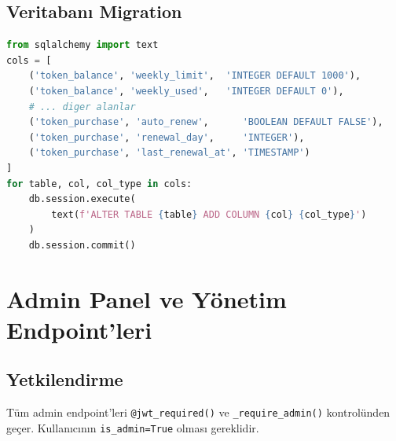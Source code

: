 \documentclass[12pt,a4paper]{article}
\begin{document}
\subsection{Veritaban{\i} Migration}
\begin{lstlisting}[language=Python, caption={Migration scripti}]
from sqlalchemy import text
cols = [
    ('token_balance', 'weekly_limit',  'INTEGER DEFAULT 1000'),
    ('token_balance', 'weekly_used',   'INTEGER DEFAULT 0'),
    # ... diger alanlar
    ('token_purchase', 'auto_renew',      'BOOLEAN DEFAULT FALSE'),
    ('token_purchase', 'renewal_day',     'INTEGER'),
    ('token_purchase', 'last_renewal_at', 'TIMESTAMP')
]
for table, col, col_type in cols:
    db.session.execute(
        text(f'ALTER TABLE {table} ADD COLUMN {col} {col_type}')
    )
    db.session.commit()
\end{lstlisting}

\section{Admin Panel ve Y\"{o}netim Endpoint'leri}

\subsection{Yetkilendirme}
T\"{u}m admin endpoint'leri \texttt{@jwt\_required()} ve \texttt{\_require\_admin()} kontrol\"{u}nden ge\c{c}er.
Kullan{\i}c{\i}n{\i}n \texttt{is\_admin=True} olmas{\i} gereklidir.
\end{document}
